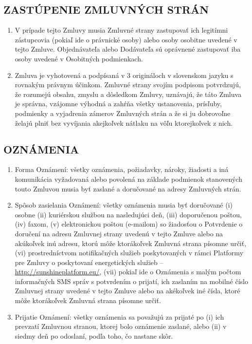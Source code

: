 \begin{multicols}{2}
\subsection{ZASTÚPENIE ZMLUVNÝCH STRÁN}

\begin{enumerate}
\def\labelenumi{\arabic{enumi}.}
\item
  V prípade tejto Zmluvy musia Zmluvné strany zastupovať ich legitímni
  zástupcovia (pokiaľ ide o právnické osoby) alebo osoby osobitne
  uvedené v tejto Zmluve. Objednávateľa alebo Dodávateľa sú oprávnené
  zastupovať iba osoby uvedené v Osobitných podmienkach.
\item
  Zmluva je vyhotovená a podpísaná v 3 origináloch v slovenskom jazyku s
  rovnakým právnym účinkom. Zmluvné strany svojím podpisom potvrdzujú,
  že rozumejú obsahu, zmyslu a dôsledkom Zmluvy, uznávajú, že táto
  Zmluva je správna, vzájomne výhodná a zahŕňa všetky ustanovenia,
  prísľuby, podmienky a vyjadrenia zámerov Zmluvných strán a že si ju
  dobrovoľne želajú plniť bez vyvíjania akejkoľvek nátlaku na vôľu
  ktorejkoľvek z nich.
\end{enumerate}

\subsection{OZNÁMENIA}

\begin{enumerate}
\def\labelenumi{\arabic{enumi}.}
\item
  Forma Oznámení: všetky oznámenia, požiadavky, nároky, žiadosti a iná
  komunikácia vyžadovaná alebo povolená na základe podmienok stanovených
  touto Zmluvou musia byť zaslané a doručované na adresy Zmluvných
  strán.
\item
  Spôsob zasielania Oznámení: všetky oznámenia musia byť doručované (i)
  osobne (ii) kuriérskou službou na nasledujúci deň, (iii) doporučenou
  poštou, (iv) faxom, (v) elektronickou poštou (e-mailom) so žiadosťou o
  Potvrdenie o doručení na adresu Zmluvnej strany uvedenú v tejto Zmluve
  alebo na akúkoľvek inú adresu, ktorú môže ktorákoľvek Zmluvná strana
  písomne určiť, (vi) prostredníctvom notifikačných služieb
  poskytovaných v rámci Platformy pre Zmluvy o poskytovaní energetických
  služieb -- \href{http://www.sharex.lv}{http://sunshineplatform.eu/},
  (vii) pokiaľ ide o Oznámenia s malým počtom informačných SMS správ s
  potvrdením o prijatí, ich zaslaním na mobilné číslo Zmluvnej strany
  uvedené v tejto Zmluve alebo na akékoľvek iné čísla, ktoré môže
  ktorákoľvek Zmluvná strana písomne určiť.
\item
  Prijatie Oznámení: všetky oznámenia sa považujú za prijaté po (i) ich
  prevzatí Zmluvnou stranou, ktorej bolo oznámenie zaslané, alebo (ii) v
  siedmy deň po odoslaní, podľa toho, čo nastane skôr.
\end{enumerate}

\end{multicols}
